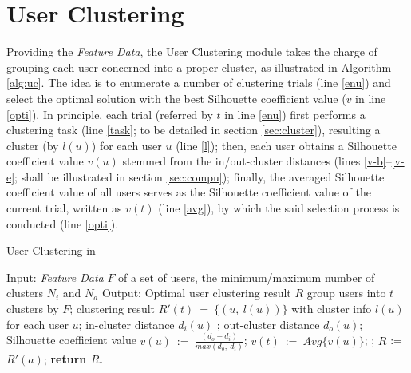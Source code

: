 \section{User Clustering}
\label{sec:uc}


Providing the \textit{Feature Data}, the User Clustering module takes the charge of grouping each user concerned into a proper cluster,
as illustrated in  Algorithm \ref{alg:uc}.
%
The idea is to enumerate a number of clustering trials (line \ref{enu}) and select the optimal solution with the best Silhouette coefficient value ($v$ in line \ref{opti}).
In principle, each trial (referred by $t$ in line \ref{enu}) first performs a clustering task (line \ref{task}; to be detailed in section \ref{sec:cluster}), resulting a cluster (by $l(u)$) for each user $u$ (line \ref{l});
then, each user obtains a Silhouette coefficient value $v(u)$ stemmed from the in/out-cluster distances (lines \ref{v-b}--\ref{v-e}; shall be illustrated in section \ref{sec:compu});
finally, the averaged Silhouette coefficient value of all users serves as the Silhouette coefficient value of the current trial, written as $v(t)$ (line \ref{avg}), by which the said selection process is conducted (line \ref{opti}).


\begin{algorithm}[t]
\begin{small}
\caption{User Clustering in \sys{}}
\label{alg:uc}
\begin{algorithmic}[1]
\State Input: \textit{Feature Data} $F$  of a set of users, the minimum/maximum number of clusters $N_i$ and $N_a$
\State Output: Optimal user clustering result $R$
\vspace{1ex}
 \label{enu}
	\State group users into $t$ clusters by $F$; \label{task}
	\State clustering result $R'(t)\ =\ \{(u,\ l(u))\}$ with cluster info $l(u)$ for each user $u$; \label{l}
		\State in-cluster distance $d_i(u)$ \label{v-b};
		\State out-cluster distance $d_o(u)$;
		\State Silhouette coefficient value $v(u)\ :=\ \frac{(d_o - d_i)}{max(d_o,\ d_i)}$; \label{v-e}
	\EndFor
	\State $v(t)\ :=\ Avg\{v(u)\}$; \label{avg}
\EndFor
{}; \label{opti}
	\State $R$ := $R'(a)$;
\EndIf
\State \bfseries{return} $R$.
\end{algorithmic}
\end{small}
\end{algorithm}


